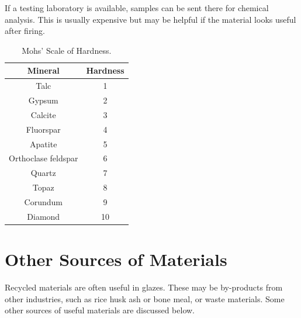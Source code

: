 If a testing laboratory is available, samples can be sent there for chemical 
analysis. This is usually expensive but may be helpful if the material looks 
useful after firing.
\begin{center}
        \renewcommand{\arraystretch}{1.5}
          \begin{table}\centering
    \begin{tabular}{|c|c|}\hline
      \textbf{Mineral}&\textbf{Hardness}\\\hline\hline
      Talc&1\\\hline
      Gypsum&2\\\hline
      Calcite&3\\\hline
      Fluorspar&4\\\hline
      Apatite&5\\\hline
      Orthoclase feldspar&6\\\hline
      Quartz&7\\\hline
      Topaz&8\\\hline
      Corundum&9\\\hline
      Diamond&10\\\hline
    \end{tabular}
    \caption{Mohs' Scale of Hardness.}
    \label{tab:mohs}
  \end{table}
\end{center}
\section{Other Sources of Materials}
Recycled materials are often useful in glazes. These may be by-products from 
other industries, such as rice husk ash or bone meal, or waste materials. Some 
other sources of useful materials are discussed below.
